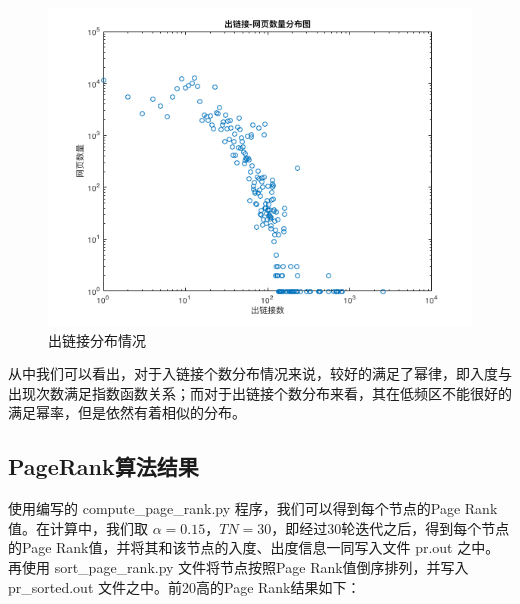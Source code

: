 \documentclass[paper=a4, fontsize=11pt, UTF8]{article} %
\numberwithin{equation}{section} %
\numberwithin{figure}{section} %
\numberwithin{table}{section} %
\begin{document}
\begin{figure}[htp]
\center
\includegraphics[scale=0.5]{out_degree}
\caption{出链接分布情况}
\end{figure}

从中我们可以看出，对于入链接个数分布情况来说，较好的满足了幂律，即入度与出现次数满足指数函数关系；而对于出链接个数分布来看，其在低频区不能很好的满足幂率，但是依然有着相似的分布。

\subsection{PageRank算法结果}

使用编写的 compute\_page\_rank.py 程序，我们可以得到每个节点的Page Rank值。在计算中，我们取 $\alpha = 0.15$，$TN=30$，即经过30轮迭代之后，得到每个节点的Page Rank值，并将其和该节点的入度、出度信息一同写入文件 pr.out 之中。再使用 sort\_page\_rank.py 文件将节点按照Page Rank值倒序排列，并写入 pr\_sorted.out 文件之中。前20高的Page Rank结果如下：
\end{document}
